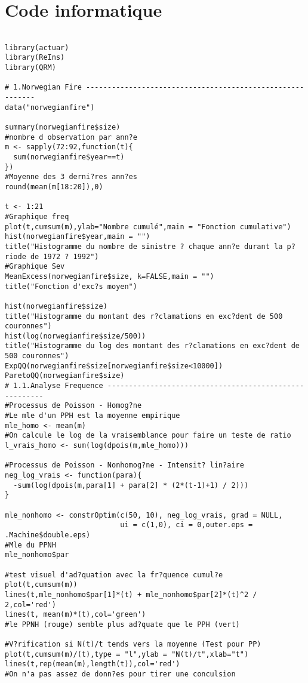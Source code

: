 \section{Code informatique}
\begin{verbatim}

library(actuar)
library(ReIns)
library(QRM)

# 1.Norwegian Fire ----------------------------------------------------------
data("norwegianfire")

summary(norwegianfire$size)
#nombre d observation par ann?e
m <- sapply(72:92,function(t){
  sum(norwegianfire$year==t)  
})
#Moyenne des 3 derni?res ann?es
round(mean(m[18:20]),0)

t <- 1:21
#Graphique freq
plot(t,cumsum(m),ylab="Nombre cumulé",main = "Fonction cumulative")
hist(norwegianfire$year,main = "")
title("Histogramme du nombre de sinistre ? chaque ann?e durant la p?riode de 1972 ? 1992")
#Graphique Sev
MeanExcess(norwegianfire$size, k=FALSE,main = "")
title("Fonction d'exc?s moyen")

hist(norwegianfire$size)
title("Histogramme du montant des r?clamations en exc?dent de 500 couronnes")
hist(log(norwegianfire$size/500))
title("Histogramme du log des montant des r?clamations en exc?dent de 500 couronnes")
ExpQQ(norwegianfire$size[norwegianfire$size<10000])
ParetoQQ(norwegianfire$size)
# 1.1.Analyse Frequence -------------------------------------------------------
#Processus de Poisson - Homog?ne
#Le mle d'un PPH est la moyenne empirique
mle_homo <- mean(m)
#On calcule le log de la vraisemblance pour faire un teste de ratio
l_vrais_homo <- sum(log(dpois(m,mle_homo)))

#Processus de Poisson - Nonhomog?ne - Intensit? lin?aire
neg_log_vrais <- function(para){
  -sum(log(dpois(m,para[1] + para[2] * (2*(t-1)+1) / 2)))
}

mle_nonhomo <- constrOptim(c(50, 10), neg_log_vrais, grad = NULL, 
                           ui = c(1,0), ci = 0,outer.eps = .Machine$double.eps)
#Mle du PPNH
mle_nonhomo$par

#test visuel d'ad?quation avec la fr?quence cumul?e
plot(t,cumsum(m))
lines(t,mle_nonhomo$par[1]*(t) + mle_nonhomo$par[2]*(t)^2 / 2,col='red')
lines(t, mean(m)*(t),col='green')
#le PPNH (rouge) semble plus ad?quate que le PPH (vert) 

#V?rification si N(t)/t tends vers la moyenne (Test pour PP)
plot(t,cumsum(m)/(t),type = "l",ylab = "N(t)/t",xlab="t")
lines(t,rep(mean(m),length(t)),col='red')
#On n'a pas assez de donn?es pour tirer une conculsion


\end{verbatim}
